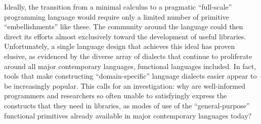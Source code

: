 Ideally, the transition from  a minimal calculus to a pragmatic ``full-scale'' programming language would require only a limited number of primitive ``embellishments'' like these. The community around the language could then direct its efforts almost exclusively toward the development of useful libraries. Unfortunately, a single language design that achieves this ideal has proven elusive, as evidenced by the diverse array of {dialects} that continue to proliferate around all major contemporary languages, functional languages included. %
In fact, tools that make constructing ``domain-specific'' language dialects easier appear to be increasingly popular. 
{This calls for an investigation}: why are well-informed programmers and researchers so often unable to satisfyingly express the constructs that they need in libraries, as modes of use of the ``general-purpose'' functional primitives already available in major contemporary languages today?


